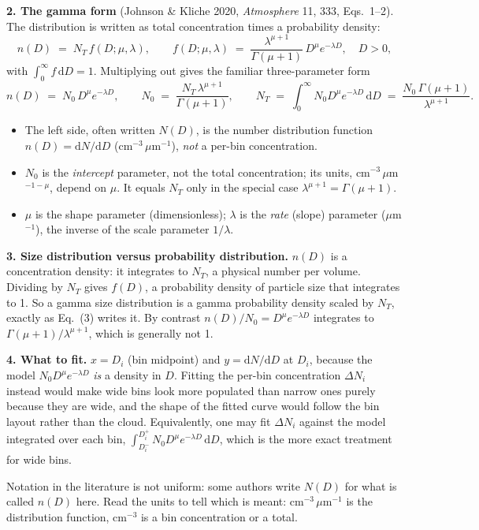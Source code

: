 \documentclass[10pt]{article}
\begin{document}
\textbf{2. The gamma form} (Johnson \& Kliche 2020, \emph{Atmosphere} 11, 333, Eqs.~1--2). The
distribution is written as total concentration times a probability density:
\begin{equation}
n(D) \;=\; N_T\, f(D;\mu,\lambda),
\qquad
f(D;\mu,\lambda) \;=\; \frac{\lambda^{\mu+1}}{\Gamma(\mu+1)}\, D^{\mu} e^{-\lambda D},\quad D>0 ,
\end{equation}
with $\int_0^\infty f\,\mathrm{d}D = 1$. Multiplying out gives the familiar three-parameter form
\begin{equation}
n(D) \;=\; N_0\, D^{\mu} e^{-\lambda D},
\qquad
N_0 \;=\; \frac{N_T\,\lambda^{\mu+1}}{\Gamma(\mu+1)},
\qquad
N_T \;=\; \int_0^\infty N_0 D^{\mu}e^{-\lambda D}\,\mathrm{d}D \;=\; \frac{N_0\,\Gamma(\mu+1)}{\lambda^{\mu+1}} .
\end{equation}
\begin{itemize}\setlength{\itemsep}{1pt}
\item The left side, often written $N(D)$, is the number distribution function $n(D)=\mathrm{d}N/\mathrm{d}D$
(cm$^{-3}\,\mu$m$^{-1}$), \emph{not} a per-bin concentration.
\item $N_0$ is the \emph{intercept} parameter, not the total concentration; its units,
cm$^{-3}\,\mu$m$^{-1-\mu}$, depend on $\mu$. It equals $N_T$ only in the special case $\lambda^{\mu+1}=\Gamma(\mu+1)$.
\item $\mu$ is the shape parameter (dimensionless); $\lambda$ is the \emph{rate} (slope) parameter
($\mu$m$^{-1}$), the inverse of the scale parameter $1/\lambda$.
\end{itemize}

\textbf{3. Size distribution versus probability distribution.} $n(D)$ is a concentration density: it
integrates to $N_T$, a physical number per volume. Dividing by $N_T$ gives $f(D)$, a probability density
of particle size that integrates to 1. So a gamma size distribution is a gamma probability density scaled
by $N_T$, exactly as Eq.~(3) writes it. By contrast $n(D)/N_0 = D^{\mu}e^{-\lambda D}$ integrates to
$\Gamma(\mu+1)/\lambda^{\mu+1}$, which is generally not 1.

\textbf{4. What to fit.} $x = D_i$ (bin midpoint) and $y = \mathrm{d}N/\mathrm{d}D$ at $D_i$, because the
model $N_0 D^{\mu}e^{-\lambda D}$ \emph{is} a density in $D$. Fitting the per-bin concentration
$\Delta N_i$ instead would make wide bins look more populated than narrow ones purely because they are
wide, and the shape of the fitted curve would follow the bin layout rather than the cloud. Equivalently,
one may fit $\Delta N_i$ against the model integrated over each bin,
$\int_{D_i^-}^{D_i^+} N_0 D^{\mu}e^{-\lambda D}\,\mathrm{d}D$, which is the more exact treatment for wide bins.

\vfill
{\footnotesize Notation in the literature is not uniform: some authors write $N(D)$ for what is called
$n(D)$ here. Read the units to tell which is meant: cm$^{-3}\,\mu$m$^{-1}$ is the distribution function,
cm$^{-3}$ is a bin concentration or a total.}
\end{document}

